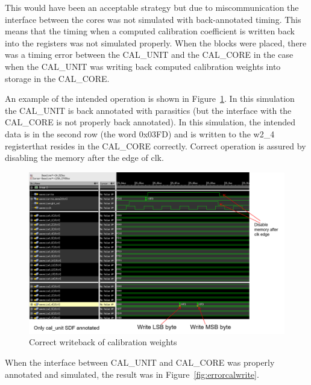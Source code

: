 This would have been an acceptable strategy but due to miscommunication the interface between the cores was not simulated with back-annotated timing. This means that the timing when a computed calibration coefficient is written back into the registers was not simulated properly. When the blocks were placed, there was a timing error between the CAL\_UNIT and the CAL\_CORE in the case when the CAL\_UNIT was writing back computed calibration weights into storage in the CAL\_CORE.

An example of the intended operation is shown in Figure~\ref{fig:correctcalwrite}. In this simulation the CAL\_UNIT is back annotated with parasitics (but the interface with the CAL\_CORE is not properly back annotated). In this simulation, the intended data is in the second row (the word 0x03FD) and is written to the w2\_4 registerthat resides in the CAL\_CORE correctly. Correct operation is assured by disabling the memory after the edge of clk.
\begin{figure}[h]
\centering
\begin{center}
\includegraphics[width=1.0\textwidth]{figures/CorrectCalWrite.png}
\end{center}
\caption{Correct writeback of calibration weights}
\label{fig:correctcalwrite}
\end{figure}

When the interface between CAL\_UNIT and CAL\_CORE was properly annotated and simulated, the result was in Figure~\ref{fig:errorcalwrite}.

